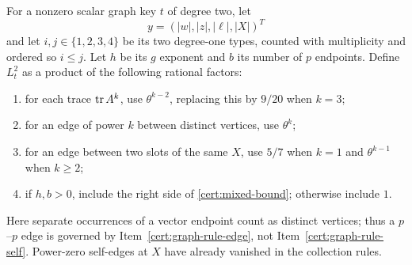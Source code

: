 For a nonzero scalar graph key $t$ of degree two, let
\[
 y=(|w|,|z|,|\ell|,|X|)^T
\]
and let $i,j\in\{1,2,3,4\}$ be its two degree-one types, counted with
multiplicity and ordered so $i\le j$.  Let $h$ be its $g$ exponent and $b$
its number of $p$ endpoints.  Define $L_t^2$ as a product of the following
rational factors:
\begin{enumerate}
\item\label{cert:graph-rule-trace}
      for each trace $\operatorname{tr} A^k$, use $\theta^{k-2}$, replacing this by
      $9/20$ when $k=3$;
\item\label{cert:graph-rule-edge}
      for an edge of power $k$ between distinct vertices, use $\theta^k$;
\item\label{cert:graph-rule-self}
      for an edge between two slots of the same $X$, use $5/7$ when $k=1$
      and $\theta^{k-1}$ when $k\ge2$;
\item\label{cert:graph-rule-mixed}
      if $h,b>0$, include the right side of \eqref{cert:mixed-bound};
      otherwise include $1$.
\end{enumerate}
Here separate occurrences of a vector endpoint count as distinct vertices;
thus a $p$--$p$ edge is governed by Item~\ref{cert:graph-rule-edge}, not
Item~\ref{cert:graph-rule-self}.  Power-zero self-edges
at $X$ have already vanished in the collection rules.

